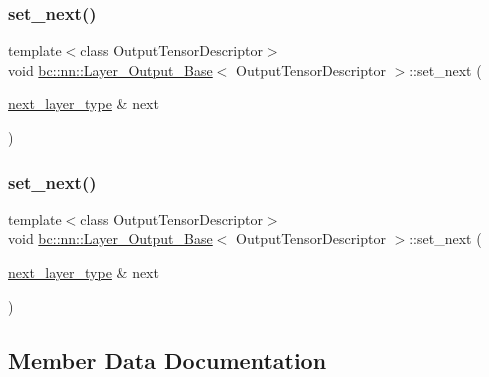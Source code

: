 \subsubsection{\texorpdfstring{set\+\_\+next()}{set\_next()}\hspace{0.1cm}{\footnotesize\ttfamily [1/2]}}
{\footnotesize\ttfamily template$<$class Output\+Tensor\+Descriptor$>$ \\
void \hyperlink{structbc_1_1nn_1_1Layer__Output__Base}{bc\+::nn\+::\+Layer\+\_\+\+Output\+\_\+\+Base}$<$ Output\+Tensor\+Descriptor $>$\+::set\+\_\+next (\begin{DoxyParamCaption}\item[{\hyperlink{structbc_1_1nn_1_1Layer__Output__Base_a0c791bc57bcc78e8d82e8a5375f1c584}{next\+\_\+layer\+\_\+type} \&}]{next }\end{DoxyParamCaption})\hspace{0.3cm}{\ttfamily [inline]}}

\mbox{\label{structbc_1_1nn_1_1Layer__Output__Base_a5a8d62346446d12d82153844b051e555}} 
\subsubsection{\texorpdfstring{set\+\_\+next()}{set\_next()}\hspace{0.1cm}{\footnotesize\ttfamily [2/2]}}
{\footnotesize\ttfamily template$<$class Output\+Tensor\+Descriptor$>$ \\
void \hyperlink{structbc_1_1nn_1_1Layer__Output__Base}{bc\+::nn\+::\+Layer\+\_\+\+Output\+\_\+\+Base}$<$ Output\+Tensor\+Descriptor $>$\+::set\+\_\+next (\begin{DoxyParamCaption}\item[{\hyperlink{structbc_1_1nn_1_1Layer__Output__Base_a0c791bc57bcc78e8d82e8a5375f1c584}{next\+\_\+layer\+\_\+type} \&}]{next }\end{DoxyParamCaption})\hspace{0.3cm}{\ttfamily [inline]}}



\subsection{Member Data Documentation}
\mbox{\label{structbc_1_1nn_1_1Layer__Output__Base_a276a95f894d4b93e834a105b3566ebf5}} 
